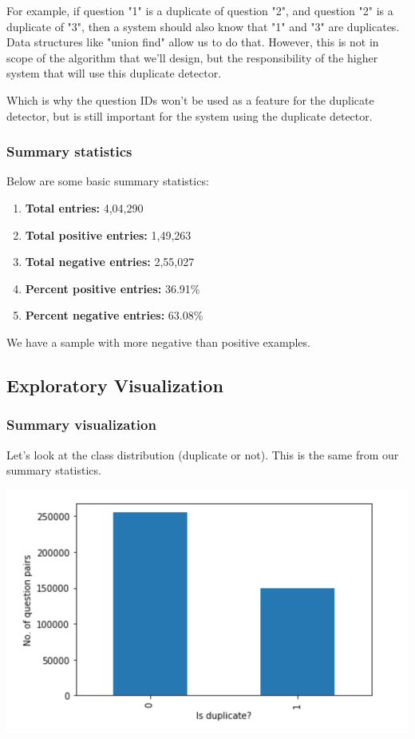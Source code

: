 \documentclass{article}
\begin{document}
For example, if question "1" is a duplicate of question "2", and question "2" is a duplicate of "3", then a system should also know that "1" and "3" are duplicates. Data structures like "union find" allow us to do that. However, this is not in scope of the algorithm that we'll design, but the responsibility of the higher system that will use this duplicate detector.

Which is why the question IDs won't be used as a feature for the duplicate detector, but is still important for the system using the duplicate detector.

\subsubsection{Summary statistics}

Below are some basic summary statistics:

\begin{enumerate}
\item{\textbf{Total entries:} 4,04,290}
\item{\textbf{Total positive entries:} 1,49,263}
\item{\textbf{Total negative entries:} 2,55,027}
\item{\textbf{Percent positive entries:} 36.91\%}
\item{\textbf{Percent negative entries:} 63.08\%}
\end{enumerate}

We have a sample with more negative than positive examples.

\subsection{Exploratory Visualization}

\subsubsection{Summary visualization}

Let's look at the class distribution (duplicate or not). This is the same from our summary statistics.

\noindent\includegraphics[width=\textwidth]{category_plot}
\end{document}
